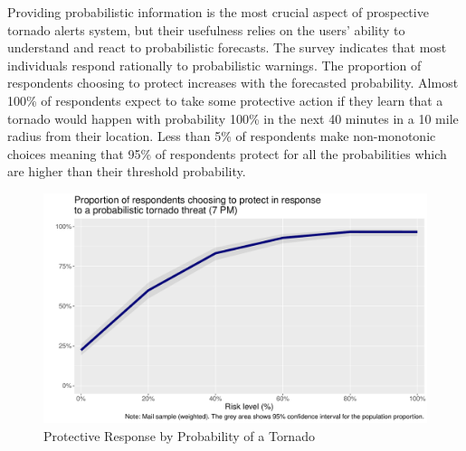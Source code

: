 \documentclass{ametsocV6.1}
\begin{document}
Providing probabilistic information is the most crucial aspect of prospective tornado alerts system, but their usefulness relies on the users' ability to understand and react to probabilistic forecasts. The survey indicates that most individuals respond rationally to probabilistic warnings. The proportion of respondents choosing to protect increases with the forecasted probability. Almost 100\% of respondents expect to take some protective action if they learn that a tornado would happen with probability 100\% in the next 40 minutes in a 10 mile radius from their location. Less than 5\% of respondents make non-monotonic choices meaning that 95\% of respondents protect for all the probabilities which are higher than their threshold probability.
\begin{figure}[!htbp]
\centering
\includegraphics[width=27pc]{../Graphs/threat_resp_mail_w.pdf} 
\caption{Protective Response by Probability of a Tornado}\label{threat_resp_mail}
\end{figure}
\end{document}
